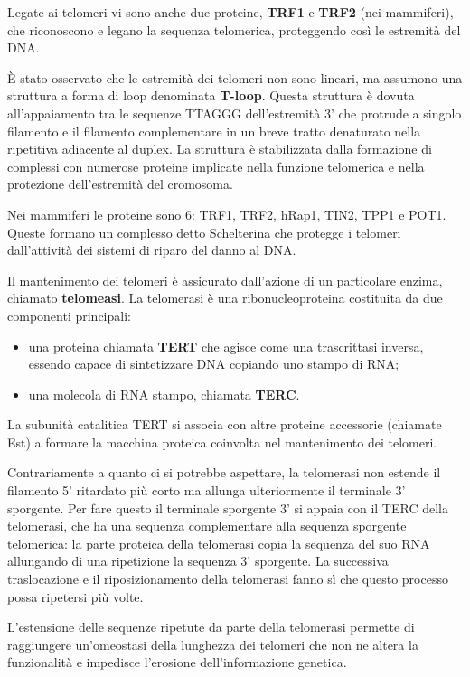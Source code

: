 \documentclass[11pt]{book}
\begin{document}
Legate ai telomeri vi sono anche due proteine, \textbf{TRF1} e
\textbf{TRF2} (nei mammiferi), che riconoscono e legano la sequenza
telomerica, proteggendo così le estremità del DNA.

È stato osservato che le estremità dei telomeri non sono lineari, ma
assumono una struttura a forma di loop denominata \textbf{T-loop}.
Questa struttura è dovuta all'appaiamento tra le sequenze TTAGGG
dell'estremità 3' che protrude a singolo filamento e il filamento
complementare in un breve tratto denaturato nella ripetitiva adiacente
al duplex. La struttura è stabilizzata dalla formazione di complessi con
numerose proteine implicate nella funzione telomerica e nella protezione
dell'estremità del cromosoma.

Nei mammiferi le proteine sono 6: TRF1, TRF2, hRap1, TIN2, TPP1 e POT1.
Queste formano un complesso detto Schelterina che protegge i telomeri
dall'attività dei sistemi di riparo del danno al DNA.

Il mantenimento dei telomeri è assicurato dall'azione di un particolare
enzima, chiamato \textbf{telomeasi}. La telomerasi è una
ribonucleoproteina costituita da due componenti principali:

\begin{itemize}
\itemsep1pt\parskip0pt
\item
  una proteina chiamata \textbf{TERT} che agisce come una trascrittasi
  inversa, essendo capace di sintetizzare DNA copiando uno stampo di
  RNA;
\item
  una molecola di RNA stampo, chiamata \textbf{TERC}.
\end{itemize}

La subunità catalitica TERT si associa con altre proteine accessorie
(chiamate Est) a formare la macchina proteica coinvolta nel mantenimento
dei telomeri.

Contrariamente a quanto ci si potrebbe aspettare, la telomerasi non
estende il filamento 5' ritardato più corto ma allunga ulteriormente il
terminale 3' sporgente. Per fare questo il terminale sporgente 3' si
appaia con il TERC della telomerasi, che ha una sequenza complementare
alla sequenza sporgente telomerica: la parte proteica della telomerasi
copia la sequenza del suo RNA allungando di una ripetizione la sequenza
3' sporgente. La successiva traslocazione e il riposizionamento della
telomerasi fanno sì che questo processo possa ripetersi più volte.

L'estensione delle sequenze ripetute da parte della telomerasi permette
di raggiungere un'omeostasi della lunghezza dei telomeri che non ne
altera la funzionalità e impedisce l'erosione dell'informazione
genetica.
\end{document}
